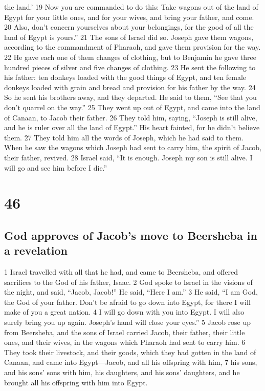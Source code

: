 the land.' {19} Now you are commanded to do this: Take wagons out of the
land of Egypt for your little ones, and for your wives, and bring your
father, and come. {20} Also, don't concern yourselves about your
belongings, for the good of all the land of Egypt is yours.'' {21} The
sons of Israel did so. Joseph gave them wagons, according to the
commandment of Pharaoh, and gave them provision for the way. {22} He
gave each one of them changes of clothing, but to Benjamin he gave three
hundred pieces of silver and five changes of clothing. {23} He sent the
following to his father: ten donkeys loaded with the good things of
Egypt, and ten female donkeys loaded with grain and bread and provision
for his father by the way. {24} So he sent his brothers away, and they
departed. He said to them, ``See that you don't quarrel on the way.''
{25} They went up out of Egypt, and came into the land of Canaan, to
Jacob their father. {26} They told him, saying, ``Joseph is still alive,
and he is ruler over all the land of Egypt.'' His heart fainted, for he
didn't believe them. {27} They told him all the words of Joseph, which
he had said to them. When he saw the wagons which Joseph had sent to
carry him, the spirit of Jacob, their father, revived. {28} Israel said,
``It is enough. Joseph my son is still alive. I will go and see him
before I die.''

\hypertarget{section-45}{%
\section{46}\label{section-45}}

\hypertarget{god-approves-of-jacobs-move-to-beersheba-in-a-revelation}{%
\subsection{God approves of Jacob's move to Beersheba in a
revelation}\label{god-approves-of-jacobs-move-to-beersheba-in-a-revelation}}

{1} Israel travelled with all that he had, and came to Beersheba, and
offered sacrifices to the God of his father, Isaac. {2} God spoke to
Israel in the visions of the night, and said, ``Jacob, Jacob!'' He said,
``Here I am.'' {3} He said, ``I am God, the God of your father. Don't be
afraid to go down into Egypt, for there I will make of you a great
nation. {4} I will go down with you into Egypt. I will also surely bring
you up again. Joseph's hand will close your eyes.'' {5} Jacob rose up
from Beersheba, and the sons of Israel carried Jacob, their father,
their little ones, and their wives, in the wagons which Pharaoh had sent
to carry him. {6} They took their livestock, and their goods, which they
had gotten in the land of Canaan, and came into Egypt---Jacob, and all
his offspring with him, {7} his sons, and his sons' sons with him, his
daughters, and his sons' daughters, and he brought all his offspring
with him into Egypt.

